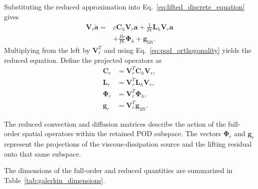 Substituting the reduced approximation into
Eq.~\eqref{eq:lifted_discrete_equation} gives
\begin{align}
    \mathbf{V}_r\dot{\mathbf{a}}
    ={}&
    c\mathbf{C}_h\mathbf{V}_r\mathbf{a}
    +\frac{1}{Pe}\mathbf{L}_h\mathbf{V}_r\mathbf{a}
    \nonumber\\
    &+
    \frac{Br}{Pe}\boldsymbol{\Phi}_h
    +\mathbf{g}_{\mathrm{lift}}.
\end{align}
Multiplying from the left by $\mathbf{V}_r^T$ and using
Eq.~\eqref{eq:pod_orthogonality} yields the reduced
equation. Define the projected operators as
\begin{align}
    \mathbf{C}_r
    &=
    \mathbf{V}_r^T\mathbf{C}_h\mathbf{V}_r,
    \label{eq:reduced_convection}
    \\
    \mathbf{L}_r
    &=
    \mathbf{V}_r^T\mathbf{L}_h\mathbf{V}_r,
    \label{eq:reduced_diffusion}
    \\
    \boldsymbol{\Phi}_r
    &=
    \mathbf{V}_r^T\boldsymbol{\Phi}_h,
    \label{eq:reduced_dissipation}
    \\
    \mathbf{g}_r
    &=
    \mathbf{V}_r^T\mathbf{g}_{\mathrm{lift}}.
    \label{eq:reduced_lifting}
\end{align}

The reduced convection and diffusion matrices describe
the action of the full-order spatial operators within the
retained POD subspace. The vectors
$\boldsymbol{\Phi}_r$ and $\mathbf{g}_r$ represent the
projections of the viscous-dissipation source and the
lifting residual onto that same subspace.

The dimensions of the full-order and reduced quantities
are summarized in Table~\ref{tab:galerkin_dimensions}.

